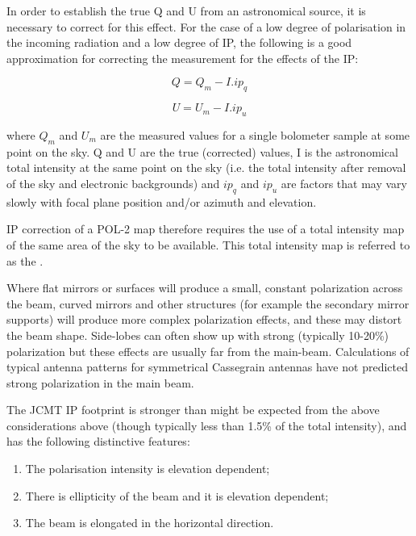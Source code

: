 In order to establish the true Q and U from an astronomical source, it is necessary to correct
for this effect. For the case of a low degree of polarisation in the incoming radiation and a low
degree of IP, the following is a good approximation for correcting the measurement for the effects of the IP:

\begin{equation}
Q = Q_{m} - I. ip_{q}
\end{equation}

\begin{equation}
U = U_{m} - I. ip_{u}
\end{equation}

where $Q_{m}$ and $U_{m}$ are the measured values for a single bolometer sample at
some point on the sky. Q and U are the true (corrected) values, I is the astronomical
total intensity at the same point on the sky (i.e. the total intensity after removal of
the sky and electronic backgrounds) and $ip_{q}$  and $ip_{u}$  are factors that may vary
slowly with focal plane position and/or azimuth and elevation.

IP correction of a POL-2 map therefore requires the use of a total intensity map of the same area
of the sky to be available. This total intensity map is referred to as the .

Where flat mirrors or surfaces will produce a small, constant polarization across the beam,
curved mirrors and other structures (for example the secondary mirror supports) will
produce more complex polarization effects, and these may distort the beam shape.
Side-lobes can often show up with strong (typically 10-20\%) polarization but these
effects are usually far from the main-beam. Calculations of typical antenna patterns
for symmetrical Cassegrain antennas have not predicted strong polarization in the main beam.

The JCMT IP footprint is stronger than might be expected from the above considerations above (though typically less than 1.5\% of
the total intensity), and has the following distinctive features:

\begin{enumerate}\itemsep-0.2em
\item The polarisation intensity is elevation dependent;
\item There is ellipticity of the beam and it is elevation dependent;
\item The beam is elongated in the horizontal direction.
\end{enumerate}

